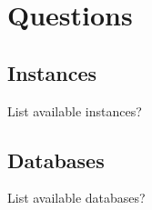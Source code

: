 
\newpage
\section{Questions}

\subsection{Instances}
\begin{itemize*}
     \item{} List available instances?
\end{itemize*}

\subsection{Databases}
\begin{itemize*}
     \item{} List available databases?
\end{itemize*}



